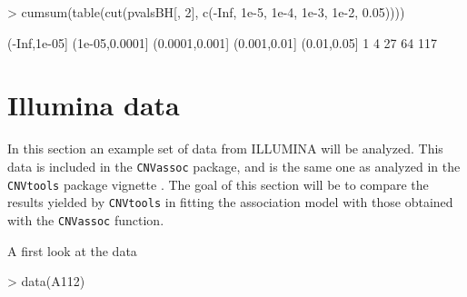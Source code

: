 \documentclass[11pt]{article}
\begin{document}
\begin{Schunk}
\begin{Sinput}
> cumsum(table(cut(pvalsBH[, 2], c(-Inf, 1e-5, 1e-4, 1e-3, 1e-2, 0.05))))
\end{Sinput}
\begin{Soutput}
  (-Inf,1e-05] (1e-05,0.0001] (0.0001,0.001]   (0.001,0.01]    (0.01,0.05] 
             1              4             27             64            117 
\end{Soutput}
\end{Schunk}
%



\section{Illumina data}


In this section an example set of data from ILLUMINA will be analyzed. 
This data is included in the \texttt{CNVassoc} package, and is the same one as analyzed in the \texttt{CNVtools} package vignette 
\cite{CNVtools-vignette}. The goal of this section will be to compare the results yielded by \texttt{CNVtools} in fitting the association model
with those obtained with the \texttt{CNVassoc} function.



A first look at the data
\begin{Schunk}
\begin{Sinput}
> data(A112)
\end{Sinput}
\end{Schunk}
\end{document}
